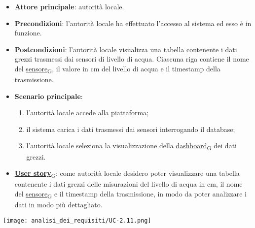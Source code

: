 \begin{itemize}
	\item \textbf{Attore principale}: autorità locale.
	\item \textbf{Precondizioni}: l'autorità locale ha effettuato l'accesso al sistema ed esso è in funzione.
	\item \textbf{Postcondizioni}: l'autorità locale visualizza una tabella contenente i dati grezzi trasmessi dai sensori di livello di acqua.
	      Ciascuna riga contiene il nome del \href{https://7last.github.io/docs/pb/documentazione-interna/glossario\#sensore}{sensore\textsubscript{G}}, il valore in cm del livello di acqua e il timestamp della trasmissione.
	\item \textbf{Scenario principale}:
	      \begin{enumerate}
		      \item l'autorità locale accede alla piattaforma;
		      \item il sistema carica i dati trasmessi dai sensori interrogando il database;
		      \item l'autorità locale seleziona la visualizzazione della \href{https://7last.github.io/docs/pb/documentazione-interna/glossario\#dashboard}{dashboard\textsubscript{G}} dei dati grezzi.
	      \end{enumerate}
	\item \href{https://7last.github.io/docs/pb/documentazione-interna/glossario\#user-story}{\textbf{User story}\textsubscript{G}}:
	      come autorità locale desidero poter visualizzare una tabella contenente i dati grezzi delle misurazioni del livello di acqua in cm,
	      il nome del \href{https://7last.github.io/docs/pb/documentazione-interna/glossario\#sensore}{sensore\textsubscript{G}} e il timestamp della trasmissione, in modo da poter analizzare i dati in modo più dettagliato.
\end{itemize}
\begin{center}
	\texttt{[image: analisi\_dei\_requisiti/UC-2.11.png]}
\end{center}


